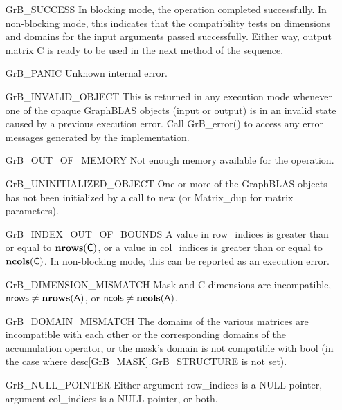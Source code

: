 \begin{itemize}[leftmargin=2.3in]
    \item[{\sf GrB\_SUCCESS}]         In blocking mode, the operation completed
    successfully. In non-blocking mode, this indicates that the compatibility 
    tests on dimensions and domains for the input arguments passed successfully. 
    Either way, output matrix {\sf C} is ready to be used in the next method of
    the sequence.

    \item[{\sf GrB\_PANIC}]           Unknown internal error.

    \item[{\sf GrB\_INVALID\_OBJECT}] This is returned in any execution mode 
    whenever one of the opaque GraphBLAS objects (input or output) is in an invalid 
    state caused by a previous execution error.  Call {\sf GrB\_error()} to access 
    any error messages generated by the implementation.

    \item[{\sf GrB\_OUT\_OF\_MEMORY}] Not enough memory available for the operation.

    \item[{\sf GrB\_UNINITIALIZED\_OBJECT}] One or more of the GraphBLAS objects 
    has not been initialized by a call to {\sf new} (or {\sf Matrix\_dup} for matrix
    parameters).

    \item[{\sf GrB\_INDEX\_OUT\_OF\_BOUNDS}]  A value in {\sf row\_indices} 
    is greater than or equal to $\bold{nrows}({\sf C})$, or a value in 
    {\sf col\_indices} is greater than or equal to $\bold{ncols}({\sf C})$.  In 
    non-blocking mode, this can be reported as an execution error.

    \item[{\sf GrB\_DIMENSION\_MISMATCH}] {\sf Mask} and {\sf C}
    dimensions are incompatible, ${\sf nrows} \neq \bold{nrows}({\sf A})$, or 
    ${\sf ncols} \neq \bold{ncols}({\sf A})$.

    \item[{\sf GrB\_DOMAIN\_MISMATCH}]    The domains of the various matrices are
    incompatible with each other or the corresponding domains of the 
    accumulation operator, or the mask's domain is not compatible with {\sf bool}
    (in the case where {\sf desc[GrB\_MASK].GrB\_STRUCTURE} is not set).

    \item[{\sf GrB\_NULL\_POINTER}] Either argument {\sf row\_indices} is a {\sf NULL} pointer,
	argument {\sf col\_indices} is a {\sf NULL} pointer, or both.
\end{itemize}


